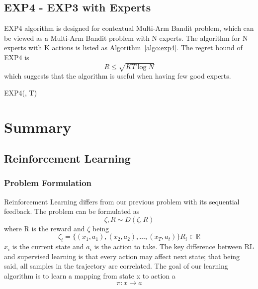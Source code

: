\documentclass[11pt]{article}
\begin{document}
\subsection{EXP4 - EXP3 with Experts}
EXP4 algorithm is designed for contextual Multi-Arm Bandit problem, which can be viewed as a Multi-Arm Bandit problem with N experts. The algorithm for N experts with K actions is listed as Algorithm~\ref{algo:exp4}. The regret bound of EXP4 is 
$$R \le \sqrt{KT \log N}$$
which suggests that the algorithm is useful when having few good experts.
\begin{algorithm}[H]
\caption{EXP4(\gamma \in [0, 1], T)}
\label{algo:exp4}
\end{algorithm}


\section{Summary}
\subsection{Reinforcement Learning}

\subsubsection*{Problem Formulation}
Reinforcement Learning differs from our previous problem with its sequential feedback. The problem can be formulated as 
$$\zeta, R \sim D(\zeta, R)$$
where R is the reward and $\zeta$ being
$$\zeta_i = \{(x_1, a_1), (x_2, a_2), \dots, (x_T, a_t)\} R_i \in \mathbb{R}$$
$x_i$ is the current state and $a_i$ is the action to take. The key difference between RL and supervised learning is that every action may affect next state; that being said, all samples in the trajectory are correlated. The goal of our learning algorithm is to learn a mapping from state x to action a 
$$\pi : x \rightarrow a$$
\end{document}
